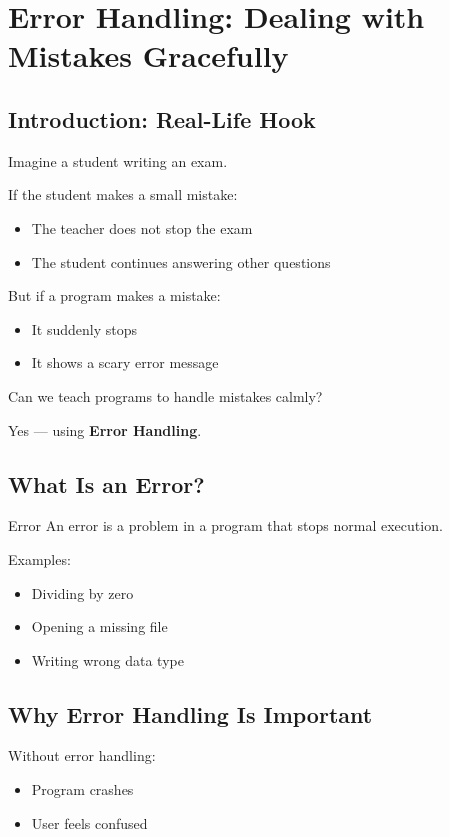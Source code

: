 \chapter{Error Handling: Dealing with Mistakes Gracefully}

\section{Introduction: Real-Life Hook}

Imagine a student writing an exam.

If the student makes a small mistake:
\begin{itemize}
    \item The teacher does not stop the exam
    \item The student continues answering other questions
\end{itemize}

But if a program makes a mistake:
\begin{itemize}
    \item It suddenly stops
    \item It shows a scary error message
\end{itemize}

Can we teach programs to handle mistakes calmly?

Yes — using \textbf{Error Handling}.

\section{What Is an Error?}

\begin{definition}{Error}
An error is a problem in a program that stops normal execution.
\end{definition}

Examples:
\begin{itemize}
    \item Dividing by zero
    \item Opening a missing file
    \item Writing wrong data type
\end{itemize}

\section{Why Error Handling Is Important}

Without error handling:
\begin{itemize}
    \item Program crashes
    \item User feels confused
\end{itemize}

